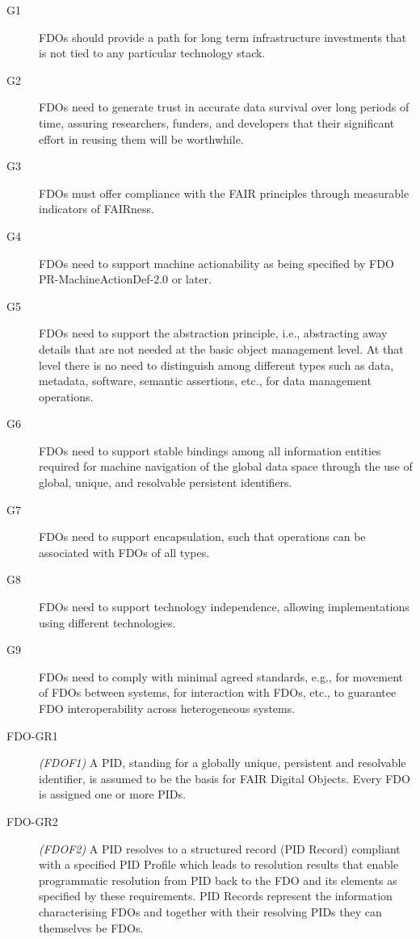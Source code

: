 \begin{description}
  \label{ch10:fdo-guidelines}
      \small
\item[G1] FDOs should provide a path for long term infrastructure investments that is not tied to any particular technology stack. 
\item[G2] FDOs need to generate trust in accurate data survival over long periods of time, assuring researchers, funders, and developers that their significant effort in reusing them will be worthwhile. 
\item[G3] FDOs must offer compliance with the \acrshort{FAIR} principles through measurable indicators of FAIRness.
\item[G4] FDOs need to support machine actionability as being specified by FDO PR-MachineActionDef-2.0 \cite{Weiland 2022b} or later. 
\item[G5] FDOs need to support the abstraction principle, i.e., abstracting away details that are not needed at the basic object management level.  At that level there is no need to distinguish among different types such as data, metadata, software, semantic assertions, etc., for data management operations. 
\item[G6] FDOs need to support stable bindings among all information entities required for machine navigation of the global data space through the use of global, unique, and resolvable persistent identifiers. 
\item[G7] FDOs need to support encapsulation, such that operations can be associated with FDOs of all types.  
\item[G8] FDOs need to support technology independence, allowing implementations using different technologies. 
\item[G9] FDOs need to comply with minimal agreed standards, e.g., for movement of FDOs between systems, for interaction with FDOs, etc., to guarantee FDO interoperability across heterogeneous systems.
\item[FDO-GR1] \emph{(FDOF1)} A \acrshort{PID}, standing for a globally unique, persistent and resolvable identifier, is assumed to be the basis for FAIR Digital Objects.  Every FDO is assigned one or more PIDs. 
\item[FDO-GR2] \emph{(FDOF2)} A PID resolves to a structured record (PID Record) compliant with a specified PID Profile which leads to resolution results that enable programmatic resolution from PID back to the FDO and its elements as specified by these requirements.  PID Records represent the information characterising FDOs and together with their resolving PIDs they can themselves be FDOs.

\end{description}

